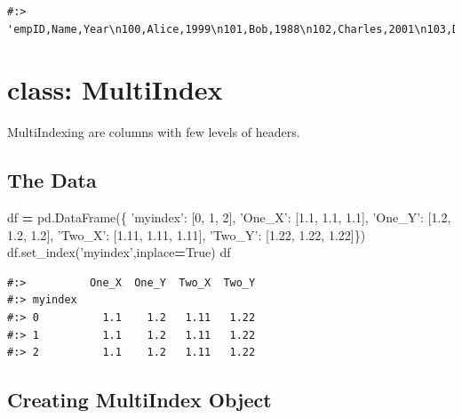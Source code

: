 \documentclass[
]{book}
\newenvironment{Shaded}{\begin{snugshade}}{\end{snugshade}}
\newcommand{\DecValTok}[1]{\textcolor[rgb]{0.06,0.06,0.06}{#1}}
\newcommand{\FloatTok}[1]{\textcolor[rgb]{0.06,0.06,0.06}{#1}}
\newcommand{\NormalTok}[1]{#1}
\newcommand{\OperatorTok}[1]{\textcolor[rgb]{0.43,0.43,0.43}{\textbf{#1}}}
\newcommand{\StringTok}[1]{\textcolor[rgb]{0.5,0.5,0.5}{#1}}
\newcommand{\VariableTok}[1]{\textcolor[rgb]{0,0,0}{#1}}
\begin{document}
\begin{verbatim}
#:> 'empID,Name,Year\n100,Alice,1999\n101,Bob,1988\n102,Charles,2001\n103,David,2010\n104,Eric,2020\n'
\end{verbatim}

\hypertarget{class-multiindex}{%
\section{class: MultiIndex}\label{class-multiindex}}

MultiIndexing are columns with few levels of headers.

\hypertarget{the-data-2}{%
\subsection{The Data}\label{the-data-2}}

\begin{Shaded}
\begin{Highlighting}[]
\NormalTok{df }\OperatorTok{=}\NormalTok{ pd.DataFrame(\{}
     \StringTok{'myindex'}\NormalTok{: [}\DecValTok{0}\NormalTok{, }\DecValTok{1}\NormalTok{, }\DecValTok{2}\NormalTok{],}
     \StringTok{'One_X'}\NormalTok{:   [}\FloatTok{1.1}\NormalTok{,  }\FloatTok{1.1}\NormalTok{,  }\FloatTok{1.1}\NormalTok{],}
     \StringTok{'One_Y'}\NormalTok{:   [}\FloatTok{1.2}\NormalTok{,  }\FloatTok{1.2}\NormalTok{,  }\FloatTok{1.2}\NormalTok{],}
     \StringTok{'Two_X'}\NormalTok{:   [}\FloatTok{1.11}\NormalTok{, }\FloatTok{1.11}\NormalTok{, }\FloatTok{1.11}\NormalTok{],}
     \StringTok{'Two_Y'}\NormalTok{:   [}\FloatTok{1.22}\NormalTok{, }\FloatTok{1.22}\NormalTok{, }\FloatTok{1.22}\NormalTok{]\})}
\NormalTok{df.set_index(}\StringTok{'myindex'}\NormalTok{,inplace}\OperatorTok{=}\VariableTok{True}\NormalTok{)}
\NormalTok{df}
\end{Highlighting}
\end{Shaded}

\begin{verbatim}
#:>          One_X  One_Y  Two_X  Two_Y
#:> myindex                            
#:> 0          1.1    1.2   1.11   1.22
#:> 1          1.1    1.2   1.11   1.22
#:> 2          1.1    1.2   1.11   1.22
\end{verbatim}

\hypertarget{creating-multiindex-object}{%
\subsection{Creating MultiIndex Object}\label{creating-multiindex-object}}
\end{document}
